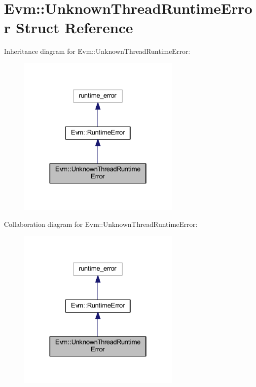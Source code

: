 \hypertarget{struct_evm_1_1_unknown_thread_runtime_error}{}\section{Evm\+:\+:Unknown\+Thread\+Runtime\+Error Struct Reference}
\label{struct_evm_1_1_unknown_thread_runtime_error}


Inheritance diagram for Evm\+:\+:Unknown\+Thread\+Runtime\+Error\+:
\nopagebreak
\begin{figure}[H]
\begin{center}
\leavevmode
\includegraphics[width=226pt]{struct_evm_1_1_unknown_thread_runtime_error__inherit__graph}
\end{center}
\end{figure}


Collaboration diagram for Evm\+:\+:Unknown\+Thread\+Runtime\+Error\+:
\nopagebreak
\begin{figure}[H]
\begin{center}
\leavevmode
\includegraphics[width=226pt]{struct_evm_1_1_unknown_thread_runtime_error__coll__graph}
\end{center}
\end{figure}
